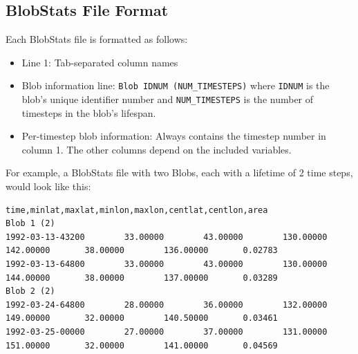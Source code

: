 \documentclass{article}
\begin{document}
\begin{appendix}
\section{BlobStats File Format}\label{blobformat}
Each BlobStats file is formatted as follows:\begin{itemize}
\item[] Line 1: Tab-separated column names 
\item[]Blob information line: \texttt{Blob IDNUM (NUM\_TIMESTEPS)} where \texttt{IDNUM} is the blob's unique identifier number and \texttt{NUM\_TIMESTEPS} is the number of timesteps in the blob's lifespan.
\item[] Per-timestep blob information: Always contains the timestep number in column 1. The other columns depend on the included variables. 
\end{itemize}

For example, a BlobStats file with two Blobs, each with a lifetime of 2 time steps, would look like this:

\begin{verbatim}
time,minlat,maxlat,minlon,maxlon,centlat,centlon,area
Blob 1 (2)
1992-03-13-43200        33.00000        43.00000        130.00000       142.00000       38.00000        136.00000       0.02783
1992-03-13-64800        33.00000        43.00000        130.00000       144.00000       38.00000        137.00000       0.03289
Blob 2 (2)
1992-03-24-64800        28.00000        36.00000        132.00000       149.00000       32.00000        140.50000       0.03461
1992-03-25-00000        27.00000        37.00000        131.00000       151.00000       32.00000        141.00000       0.04569
\end{verbatim}



\end{appendix}
\end{document}
